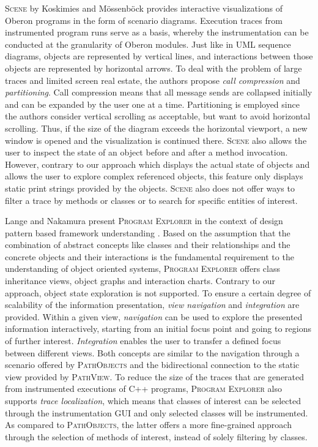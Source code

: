 \textsc{Scene} by Koskimies and Mössenböck \cite{koskimies_scene:_1996} provides interactive visualizations of Oberon programs in the form of scenario diagrams.
Execution traces from instrumented program runs serve as a basis, whereby the instrumentation can be conducted at the granularity of Oberon modules.
Just like in UML sequence diagrams, objects are represented by vertical lines, and interactions between those objects are represented by horizontal arrows.
To deal with the problem of large traces and limited screen  real estate, the authors propose \emph{call compression} and \emph{partitioning}.
Call compression means that all message sends are collapsed initially and can be expanded by the user one at a time.
Partitioning is employed since the authors consider vertical scrolling as acceptable, but want to avoid horizontal scrolling. Thus, if the size of the diagram exceeds the horizontal viewport, a new window is opened and the visualization is continued there.
\textsc{Scene} also allows the user to inspect the state of an object before and after a method invocation.
However, contrary to our approach which displays the actual state of objects and allows the user to explore complex referenced objects, this feature only displays static print strings provided by the objects.
\textsc{Scene} also does not offer ways to filter a trace by methods or classes or to search for specific entities of interest.

Lange and Nakamura present \textsc{Program Explorer} in the context of design pattern based framework understanding \cite{lange_interactive_1995, lange_program_1995, lange_object-oriented_1997}.
Based on the assumption that the combination of abstract concepts like classes and their relationships and the concrete objects and their interactions is the fundamental requirement to the understanding of object oriented systems, \textsc{Program Explorer} offers class inheritance views, object graphs and interaction charts.
Contrary to our approach, object state exploration is not supported.
To ensure a certain degree of scalability of the information presentation, \emph{view navigation} and \emph{integration} are provided.
Within a given view, \emph{navigation} can be used to explore the presented information interactively, starting from an initial focus point and going to regions of further interest.
\emph{Integration} enables the user to transfer a defined focus between different views.
Both concepts are similar to the navigation through a scenario offered by \textsc{PathObjects} and the bidirectional connection to the static view provided by \textsc{PathView}.
To reduce the size of the traces that are generated from instrumented executions of C++ programs, \textsc{Program Explorer} also supports \emph{trace localization}, which means that classes of interest can be selected through the instrumentation GUI and only selected classes will be instrumented.
As compared to \textsc{PathObjects}, the latter offers a more fine-grained approach through the selection of methods of interest, instead of solely filtering by classes.

